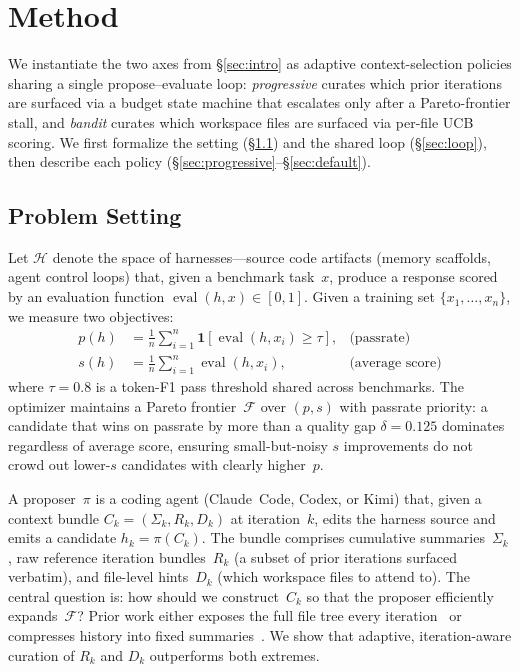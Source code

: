 \section{Method}
\label{sec:method}

We instantiate the two axes from \S\ref{sec:intro} as adaptive
context-selection policies sharing a single propose--evaluate loop:
\emph{progressive} curates which prior iterations are surfaced via a
budget state machine that escalates only after a Pareto-frontier
stall, and \emph{bandit} curates which workspace files are surfaced
via per-file UCB scoring. We first formalize the setting
(\S\ref{sec:setting}) and the shared loop (\S\ref{sec:loop}), then
describe each policy
(\S\ref{sec:progressive}--\S\ref{sec:default}).

\subsection{Problem Setting}
\label{sec:setting}

Let $\mathcal{H}$ denote the space of harnesses---source code
artifacts (memory scaffolds, agent control loops) that, given a benchmark
task~$x$, produce a response scored by an evaluation function
$\operatorname{eval}(h,x)\!\in\![0,1]$. Given a training set
$\{x_1,\ldots,x_n\}$, we measure two objectives:
\begin{align}
  p(h) &= \tfrac{1}{n}\textstyle\sum_{i=1}^{n}
           \mathbf{1}[\operatorname{eval}(h,x_i)\!\ge\!\tau],
           &\text{(passrate)} \label{eq:passrate} \\
  s(h) &= \tfrac{1}{n}\textstyle\sum_{i=1}^{n}
           \operatorname{eval}(h,x_i),
           &\text{(average score)} \label{eq:avgscore}
\end{align}
where $\tau\!=\!0.8$ is a token-F1 pass threshold shared across
benchmarks. The optimizer maintains a Pareto frontier~$\mathcal{F}$
over $(p,s)$ with passrate priority: a candidate that wins on passrate
by more than a quality gap $\delta\!=\!0.125$ dominates regardless of
average score, ensuring small-but-noisy $s$ improvements do not crowd
out lower-$s$ candidates with clearly higher~$p$.

A proposer~$\pi$ is a coding agent (Claude~Code, Codex, or Kimi)
that, given a context bundle $C_k = (\Sigma_k, R_k, D_k)$ at
iteration~$k$, edits the harness source and emits a candidate
$h_k = \pi(C_k)$. The bundle comprises cumulative summaries~$\Sigma_k$,
raw reference iteration bundles~$R_k$ (a subset of prior iterations
surfaced verbatim), and file-level hints~$D_k$ (which workspace files
to attend to). The central question is: how should we construct~$C_k$
so that the proposer efficiently expands~$\mathcal{F}$?
Prior work either exposes the full file tree every
iteration~\cite{lee2026metaharness} or compresses history into fixed
summaries~\cite{zhang2025ace,sharma2025openevolve}. We show that
adaptive, iteration-aware curation of $R_k$ and $D_k$ outperforms
both extremes.

